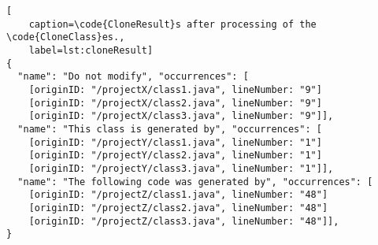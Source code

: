 
\begin{lstlisting}[
	caption=\code{CloneResult}s after processing of the \code{CloneClass}es.,
	label=lst:cloneResult]
{
  "name": "Do not modify", "occurrences": [
    [originID: "/projectX/class1.java", lineNumber: "9"]
    [originID: "/projectX/class2.java", lineNumber: "9"]
    [originID: "/projectX/class3.java", lineNumber: "9"]],
  "name": "This class is generated by", "occurrences": [
    [originID: "/projectY/class1.java", lineNumber: "1"]
    [originID: "/projectY/class2.java", lineNumber: "1"]
    [originID: "/projectY/class3.java", lineNumber: "1"]],
  "name": "The following code was generated by", "occurrences": [
    [originID: "/projectZ/class1.java", lineNumber: "48"]
    [originID: "/projectZ/class2.java", lineNumber: "48"]
    [originID: "/projectZ/class3.java", lineNumber: "48"]],
}
\end{lstlisting}